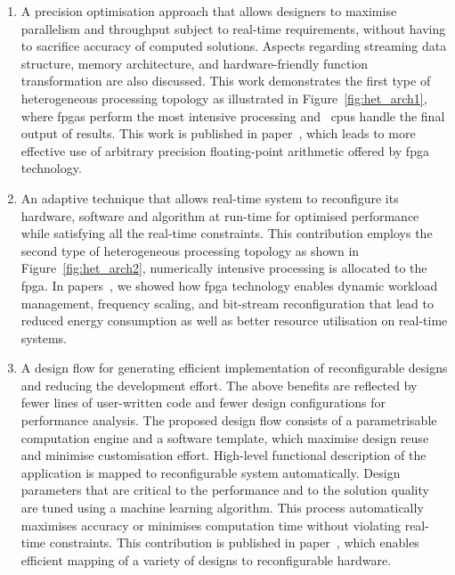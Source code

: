\begin{enumerate}
\item A precision optimisation approach that allows designers to maximise parallelism and throughput subject to real-time requirements, without having to sacrifice accuracy of computed solutions.
Aspects regarding streaming data structure, memory architecture, and hardware-friendly function transformation are also discussed.
This work demonstrates the first type of heterogeneous processing topology as illustrated in Figure~\ref{fig:het_arch1}, where \glspl{fpga} perform the most intensive processing and ~\glspl{cpu} handle the final output of results.
This work is published in paper~\cite{chau13fpt}, which leads to more effective use of arbitrary precision floating-point arithmetic offered by \gls{fpga} technology.
\item An adaptive technique that allows real-time system to reconfigure its hardware, software and algorithm at run-time for optimised performance while satisfying all the real-time constraints.
This contribution employs the second type of heterogeneous processing topology as shown in Figure~\ref{fig:het_arch2}, numerically intensive processing is allocated to the \gls{fpga}.
In papers~\cite{chau13arc,chau14trets}, we showed how \gls{fpga} technology enables dynamic workload management, frequency scaling, and bit-stream reconfiguration that lead to reduced energy consumption as well as better resource utilisation on real-time systems. 
\item A design flow for generating efficient implementation of reconfigurable designs and reducing the development effort.
The above benefits are reflected by fewer lines of user-written code and fewer design configurations for performance analysis.
The proposed design flow consists of a parametrisable computation engine and a software template, which maximise design reuse and minimise customisation effort.
High-level functional description of the application is mapped to reconfigurable system automatically.
Design parameters that are critical to the performance and to the solution quality are tuned using a machine learning algorithm.
This process automatically maximises accuracy or minimises computation time without violating real-time constraints.
This contribution is published in paper~\cite{chau14fccm}, which enables efficient mapping of a variety of designs to reconfigurable hardware.
\end{enumerate}

